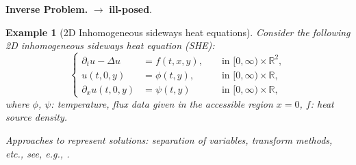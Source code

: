 \documentclass[oneside,11pt]{book}
\numberwithin{equation}{section}
\newtheorem{example}{Example}[section]
\begin{document}
\textbf{Inverse Problem.}  $\to$ \textbf{ill-posed}.
\begin{example}[2D Inhomogeneous sideways heat equations]
    Consider the following 2D inhomogeneous sideways heat equation (SHE):
    \begin{equation}
        \label{2D inhomogeneous sideways heat equation}
        \tag{2D-iSHE}
        \left\{\begin{split}
            \partial_tu - \Delta u &= f(t,x,y), &&\mbox{ in } [0,\infty)\times\mathbb{R}^2,\\
            u(t,0,y) &= \phi(t,y), &&\mbox{ in } [0,\infty)\times\mathbb{R},\\
            \partial_xu(t,0,y) &= \psi(t,y) &&\mbox{ in } [0,\infty)\times\mathbb{R},
        \end{split}\right.
    \end{equation}
    where $\phi$, $\psi$: \emph{temperature, flux data} given in the \emph{accessible region} $x = 0$, $f$: heat source density.
    
    Approaches to represent solutions: separation of variables, transform methods, etc., see, e.g., \cite{Evans2010}.
    

\end{example}
\end{document}
